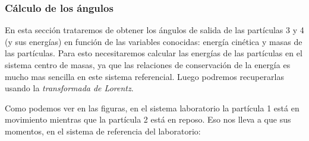 \begin{minipage}[t]{0.45\linewidth} 
\begin{center}
\end{center}
\end{minipage}
\hfill
\begin{minipage}[t]{0.45\linewidth}
\begin{center}
\end{center}
\end{minipage}

\subsubsection{Cálculo de los ángulos}
En esta sección trataremos de obtener los ángulos de salida de las partículas 3 y 4 (y sus energías) en función de las variables conocidas: energía cinética y masas de las partículas. Para esto necesitaremos calcular las energías de las partículas en el sistema centro de masas, ya que las relaciones de conservación de la energía es mucho mas sencilla en este sistema referencial. Luego podremos recuperarlas usando la \textit{transformada de Lorentz}. 

Como podemos ver en las figuras, en el sistema laboratorio la partícula 1 está en movimiento mientras que la partícula 2 está en reposo. Eso nos lleva a que sus momentos, en el sistema de referencia del laboratorio:

